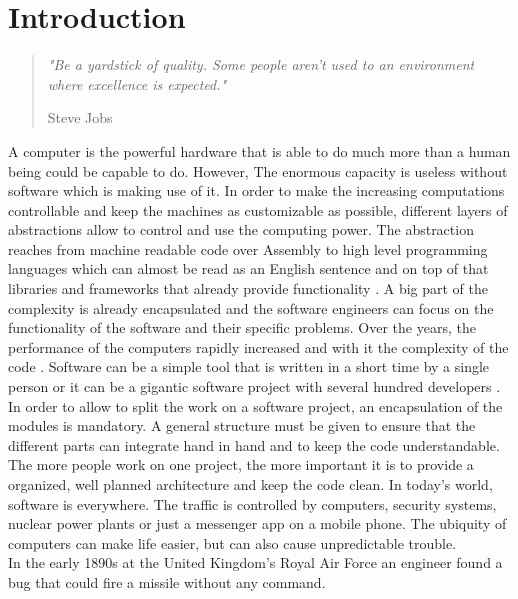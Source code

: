 \chapter{Introduction}

\begin{quote}
\centering 
\em %
"Be a yardstick of quality. Some people aren't used to an environment where excellence is expected."

\medskip
\raggedleft
Steve Jobs
\end{quote}
\vspace{10 mm}

A computer is the powerful hardware that is able to do much more than a human being could be capable to do. However, The enormous capacity is useless without software which is making use of it. In order to make the increasing computations controllable and keep the machines as customizable as possible, different layers of abstractions allow to control and use the computing power. The abstraction reaches from machine readable code over Assembly to high level programming languages which can almost be read as an English sentence and on top of that libraries and frameworks that already provide functionality \cite{Martin:2008:CCH:1388398}. A big part of the complexity is already encapsulated and the software engineers can focus on the functionality of the software and their specific problems.
\bigbreak
Over the years, the performance of the computers rapidly increased and with it the complexity of the code \cite{wirth2008brief}.
Software can be a simple tool that is written in a short time by a single person or it can be a gigantic software project with several hundred developers \cite{cusumano1997microsoft}.
In order to allow to split the work on a software project, an encapsulation of the modules is mandatory. A general structure must be given to ensure that the different parts can integrate hand in hand and to keep the code understandable. The more people work on one project, the more important it is to provide a organized, well planned architecture and keep the code clean.
\bigbreak
In today's world, software is everywhere. The traffic is controlled by computers, security systems, nuclear power plants or just a messenger app on a mobile phone. 
The ubiquity of computers can make life easier, but can also cause unpredictable trouble.\\
In the early 1890s at the United Kingdom's Royal Air Force an engineer found a bug that could fire a missile without any command. \cite{ross2005exterminators}
